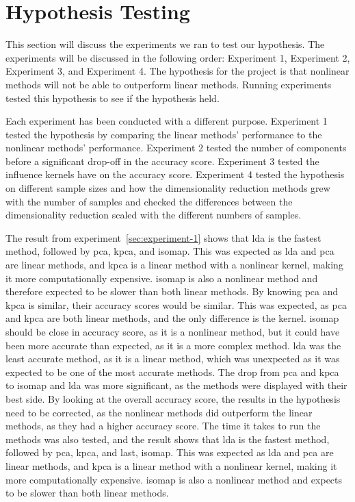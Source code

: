 \section{Hypothesis Testing} \label{sec:experiments}
This section will discuss the experiments we ran to test our hypothesis. The experiments will be discussed in the following order: Experiment 1, Experiment 2, Experiment 3, and Experiment 4. The hypothesis for the project is that nonlinear methods will not be able to outperform linear methods. Running experiments tested this hypothesis to see if the hypothesis held. 

Each experiment has been conducted with a different purpose. Experiment 1 tested the hypothesis by comparing the linear methods' performance to the nonlinear methods' performance. Experiment 2 tested the number of components before a significant drop-off in the accuracy score. Experiment 3 tested the influence kernels have on the accuracy score. Experiment 4 tested the hypothesis on different sample sizes and how the dimensionality reduction methods grew with the number of samples and checked the differences between the dimensionality reduction scaled with the different numbers of samples.

The result from experiment~\ref{sec:experiment-1} shows that \gls{lda} is the fastest method, followed by \gls{pca}, \gls{kpca}, and \gls{isomap}. This was expected as \gls{lda} and \gls{pca} are linear methods, and \gls{kpca} is a linear method with a nonlinear kernel, making it more computationally expensive. \gls{isomap} is also a nonlinear method and therefore expected to be slower than both linear methods. By knowing \gls{pca} and \gls{kpca} is similar, their accuracy scores would be similar. This was expected, as \gls{pca} and \gls{kpca} are both linear methods, and the only difference is the kernel. \gls{isomap} should be close in accuracy score, as it is a nonlinear method, but it could have been more accurate than expected, as it is a more complex method. \gls{lda} was the least accurate method, as it is a linear method, which was unexpected as it was expected to be one of the most accurate methods. The drop from \gls{pca} and \gls{kpca} to \gls{isomap} and \gls{lda} was more significant, as the methods were displayed with their best side. By looking at the overall accuracy score, the results in the hypothesis need to be corrected, as the nonlinear methods did outperform the linear methods, as they had a higher accuracy score. The time it takes to run the methods was also tested, and the result shows that \gls{lda} is the fastest method, followed by \gls{pca}, \gls{kpca}, and last, \gls{isomap}. This was expected as \gls{lda} and \gls{pca} are linear methods, and \gls{kpca} is a linear method with a nonlinear kernel, making it more computationally expensive. \gls{isomap} is also a nonlinear method and expects to be slower than both linear methods.


